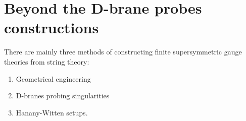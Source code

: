 \part{Beyond the D-brane probes constructions}

    There are mainly three methods of constructing finite supersymmetric gauge theories from string theory:
    \begin{enumerate}
        \item Geometrical engineering
        \item D-branes probing singularities
        \item Hanany-Witten setups.
    \end{enumerate}